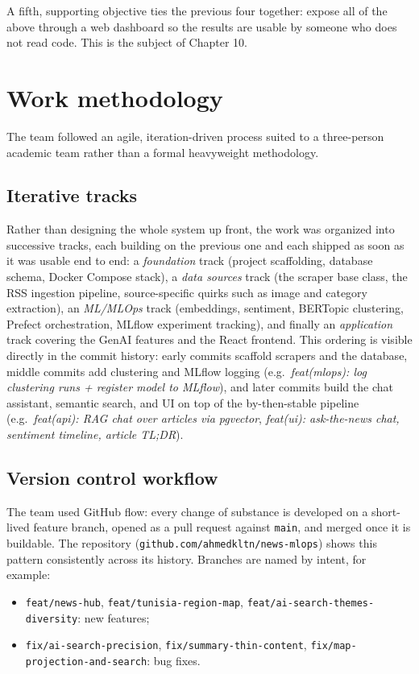 A fifth, supporting objective ties the previous four together: expose all of the above through a web dashboard so the results are usable by someone who does not read code. This is the subject of Chapter 10.

\section{Work methodology}
The team followed an agile, iteration-driven process suited to a three-person academic team rather than a formal heavyweight methodology.

\subsection{Iterative tracks}
Rather than designing the whole system up front, the work was organized into successive tracks, each building on the previous one and each shipped as soon as it was usable end to end: a \emph{foundation} track (project scaffolding, database schema, Docker Compose stack), a \emph{data sources} track (the scraper base class, the RSS ingestion pipeline, source-specific quirks such as image and category extraction), an \emph{ML/MLOps} track (embeddings, sentiment, BERTopic clustering, Prefect orchestration, MLflow experiment tracking), and finally an \emph{application} track covering the GenAI features and the React frontend. This ordering is visible directly in the commit history: early commits scaffold scrapers and the database, middle commits add clustering and MLflow logging (e.g.\ \textit{feat(mlops): log clustering runs + register model to MLflow}), and later commits build the chat assistant, semantic search, and UI on top of the by-then-stable pipeline (e.g.\ \textit{feat(api): RAG chat over articles via pgvector}, \textit{feat(ui): ask-the-news chat, sentiment timeline, article TL;DR}).

\subsection{Version control workflow}
The team used GitHub flow: every change of substance is developed on a short-lived feature branch, opened as a pull request against \texttt{main}, and merged once it is buildable. The repository (\texttt{github.com/\allowbreak ahmedkltn/\allowbreak news-mlops}) shows this pattern consistently across its history. Branches are named by intent, for example:

\begin{itemize}
    \item \texttt{feat/\allowbreak news-hub}, \texttt{feat/\allowbreak tunisia-region-map}, \texttt{feat/\allowbreak ai-search-themes-diversity}: new features;
    \item \texttt{fix/\allowbreak ai-search-precision}, \texttt{fix/\allowbreak summary-thin-content}, \texttt{fix/\allowbreak map-projection-and-search}: bug fixes.
\end{itemize}

